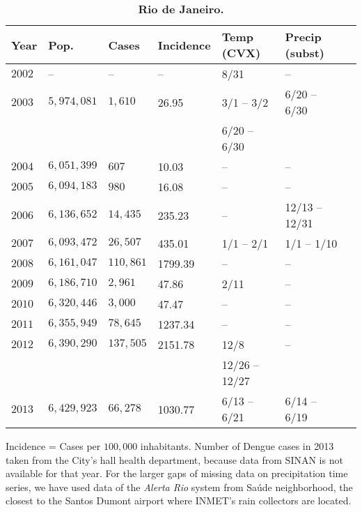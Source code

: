 \documentclass[final,leqno]{siamltexmm2}
\begin{document}
     

        

\begin{table}[!ht]
\centering
\caption{
{\bf Rio de Janeiro.}}
\begin{tabular}{|l|l|l|l|l|l|l|}
\hline
\multicolumn{1}{|l|}{\bf Year} & \multicolumn{1}{|l|}{\bf Pop.} & \multicolumn{1}{|l|}{\bf Cases}&\multicolumn{1}{|l|}{\bf Incidence}&\multicolumn{1}{|l|}{\bf Temp (CVX)}&\multicolumn{1}{|l|}{\bf Precip (subst)} \\ \hline %
$2002$ & --  & --  & -- & 8/31 & --   \\ \hline
$2003$ & $5,974,081 $ & $1,610$  &  \cellcolor{blue!25} 26.95 &   3/1 -- 3/2   & 6/20 -- 6/30  \\ 
       &              &          &  \cellcolor{blue!25}       &  6/20 -- 6/30  &                \\ \hline  
$2004$ & $6,051,399 $ & $607$  &  \cellcolor{blue!25}10.03 & -- & -- \\ \hline
$2005$ & $ 6,094,183 $ & $980 $   & \cellcolor{blue!25}16.08 & -- & -- \\ \hline
$2006$ & $6,136,652$ & $14,435 $   &  \cellcolor{red!25} 235.23 & -- & 12/13 -- 12/31 \\ \hline
$2007$ & $6,093,472$ & $26,507 $   &  \cellcolor{red!25}  435.01  & 1/1 -- 2/1 & 1/1 -- 1/10   \\ \hline
$2008$ & $6,161,047 $ & $ 110,861$    &  \cellcolor{red!25} 1799.39 & -- & -- \\ \hline
$2009$ & $6,186,710$ & $ 2,961$ &  \cellcolor{blue!25}47.86 &  2/11 & -- \\ \hline
$2010$ & $6,320,446$ & $3,000$  & \cellcolor{blue!25} 47.47 & -- & --\\ \hline
$2011$ & $6,355,949 $ & $78,645$    & \cellcolor{red!25}1237.34 & --  & --\\ \hline
$2012$ & $6,390,290 $ & $137,505$  & \cellcolor{red!25}2151.78  &  12/8             &  --  \\ 
       &              &          &  \cellcolor{red!25}          &  12/26 -- 12/27   &                \\ \hline   
$2013$ & $6,429,923$ & $ 66,278 $  & \cellcolor{red!25}1030.77 &  6/13 -- 6/21 & 6/14 -- 6/19 \\ \hline
\end{tabular}
\begin{flushleft}
\vspace{.5cm}
Incidence = Cases per $100,000$ inhabitants. Number of Dengue cases in 2013 taken from the City's hall health department, 
because data from SINAN is not available for that year. For the larger gaps of missing data on precipitation time series, we have used 
data of the \emph{Alerta Rio} system  from  Sa\'ude neighborhood, the closest to the Santos Dumont airport where INMET's rain 
collectors are located. 
\end{flushleft}
\label{table2}
\end{table}
\end{document}
